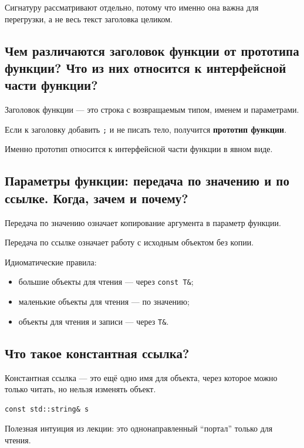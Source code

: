Сигнатуру рассматривают отдельно, потому что именно она важна для перегрузки, а не весь текст заголовка целиком.


\subsection{Чем различаются заголовок функции от прототипа функции? Что из них относится к интерфейсной части функции?}

Заголовок функции --- это строка с возвращаемым типом, именем и параметрами.

Если к заголовку добавить \texttt{;} и не писать тело, получится \textbf{прототип функции}.

Именно прототип относится к интерфейсной части функции в явном виде.


\subsection{Параметры функции: передача по значению и по ссылке. Когда, зачем и почему?}

Передача по значению означает копирование аргумента в параметр функции.

Передача по ссылке означает работу с исходным объектом без копии.

Идиоматические правила:
\begin{itemize}
    \item большие объекты для чтения --- через \texttt{const T\&};
    \item маленькие объекты для чтения --- по значению;
    \item объекты для чтения и записи --- через \texttt{T\&}.
\end{itemize}


\subsection{Что такое константная ссылка?}

Константная ссылка --- это ещё одно имя для объекта, через которое можно только читать, но нельзя изменять объект.

\begin{example}
\begin{verbatim}
const std::string& s
\end{verbatim}
\end{example}

Полезная интуиция из лекции: это однонаправленный ``портал'' только для чтения.


